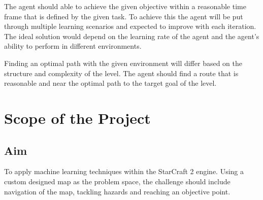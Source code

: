 \documentclass[12pt]{article}
\begin{document}
The agent should able to achieve the given objective within a reasonable
time frame that is defined by the given task. To achieve this the agent
will be put through multiple learning scenarios and expected to improve
with each iteration. The ideal solution would depend on the learning
rate of the agent and the agent’s ability to perform in different
environments.

Finding an optimal path with the given environment will differ
based on the structure and complexity of the level. The agent should
find a route that is reasonable and near the optimal path
to the target goal of the level.

\section{Scope of the Project}

\subsection{Aim}
To apply machine learning techniques within the StarCraft 2 engine.
Using a custom designed map as the problem space,
the challenge should include navigation of the map,
tackling hazards and reaching an objective point.
\end{document}
